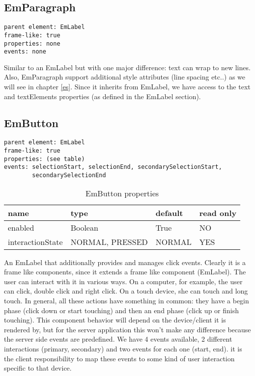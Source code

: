 \subsection{EmParagraph}

\begin{verbatim}
parent element: EmLabel
frame-like: true
properties: none
events: none
\end{verbatim}

Similar to an EmLabel but with one major difference: text can wrap to new lines. Also, EmParagraph support additional style attributes (line spacing etc..) as we will see in chapter \ref{es}. Since it inherits from EmLabel, we have access to the text and textElements properties (as defined in the EmLabel section).

\subsection{EmButton}

\begin{verbatim}
parent element: EmLabel
frame-like: true
properties: (see table)
events: selectionStart, selectionEnd, secondarySelectionStart,
        secondarySelectionEnd
\end{verbatim}

\begin{table}[ht]
\caption{EmButton properties}
\centering
\begin{tabular}{l l l l}
\hline\hline
name & type & default & read only \\ [0.5ex]
\hline %
enabled & Boolean & True & NO \\
interactionState & NORMAL, PRESSED & NORMAL & YES \\ [1ex] %
\hline %
\end{tabular}

\end{table}

An EmLabel that additionally provides and manages click events. Clearly it is a frame like components, since it extends a frame like component (EmLabel). The user can interact with it in various ways. On a computer, for example, the user can click, double click and right click. On a touch device, she can touch and long touch. In general, all these actions have something in common: they have a begin phase (click down or start touching) and then an end phase (click up or finish touching). This component behavior will depend on the device/client it is rendered by, but for the server application this won't make any difference because the server side events are predefined. We have 4 events available, 2 different interactions (primary, secondary) and two events for each one (start, end). it is the client responsibility to map these events to some kind of user interaction specific to that device.

